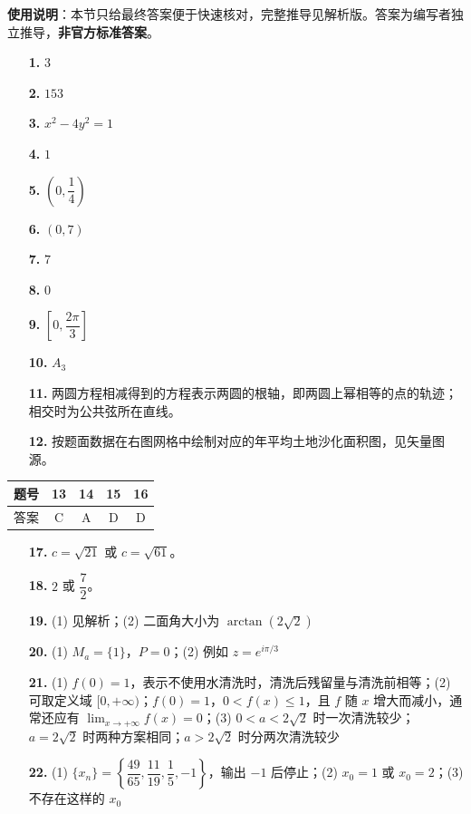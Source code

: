 
\begin{gknotice}
\textbf{使用说明}：本节只给最终答案便于快速核对，完整推导见解析版。答案为编写者独立推导，\textbf{非官方标准答案}。
\end{gknotice}

\begin{itemize}[leftmargin=2.6em]
  \item[\textbf{1.}] $3$
  \item[\textbf{2.}] $153$
  \item[\textbf{3.}] $x^2-4y^2=1$
  \item[\textbf{4.}] $1$
  \item[\textbf{5.}] $\left(0,\dfrac14\right)$
  \item[\textbf{6.}] $(0,7)$
  \item[\textbf{7.}] $7$
  \item[\textbf{8.}] $0$
  \item[\textbf{9.}] $\left[0,\dfrac{2\pi}{3}\right]$
  \item[\textbf{10.}] $A_3$
  \item[\textbf{11.}] 两圆方程相减得到的方程表示两圆的根轴，即两圆上幂相等的点的轨迹；相交时为公共弦所在直线。
  \item[\textbf{12.}] 按题面数据在右图网格中绘制对应的年平均土地沙化面积图，见矢量图源。
\end{itemize}

\begin{center}\begin{tabular}{ccccc}
\toprule
题号 & 13 & 14 & 15 & 16 \\
\midrule
答案 & C & A & D & D \\
\bottomrule
\end{tabular}\end{center}

\begin{itemize}[leftmargin=2.6em]
  \item[\textbf{17.}] $c=\sqrt{21}$ 或 $c=\sqrt{61}$。
  \item[\textbf{18.}] $2$ 或 $\dfrac72$。
  \item[\textbf{19.}] (1) 见解析；(2) 二面角大小为 $\arctan(2\sqrt2)$
  \item[\textbf{20.}] (1) $M_a=\{1\}$，$P=0$；(2) 例如 $z=e^{i\pi/3}$
  \item[\textbf{21.}] (1) $f(0)=1$，表示不使用水清洗时，清洗后残留量与清洗前相等；(2) 可取定义域 $[0,+\infty)$；$f(0)=1$，$0<f(x)\le1$，且 $f$ 随 $x$ 增大而减小，通常还应有 $\displaystyle\lim_{x\to+\infty}f(x)=0$；(3) $0<a<2\sqrt2$ 时一次清洗较少；$a=2\sqrt2$ 时两种方案相同；$a>2\sqrt2$ 时分两次清洗较少
  \item[\textbf{22.}] (1) $\{x_n\}=\left\{\dfrac{49}{65},\dfrac{11}{19},\dfrac15,-1\right\}$，输出 $-1$ 后停止；(2) $x_0=1$ 或 $x_0=2$；(3) 不存在这样的 $x_0$
\end{itemize}
